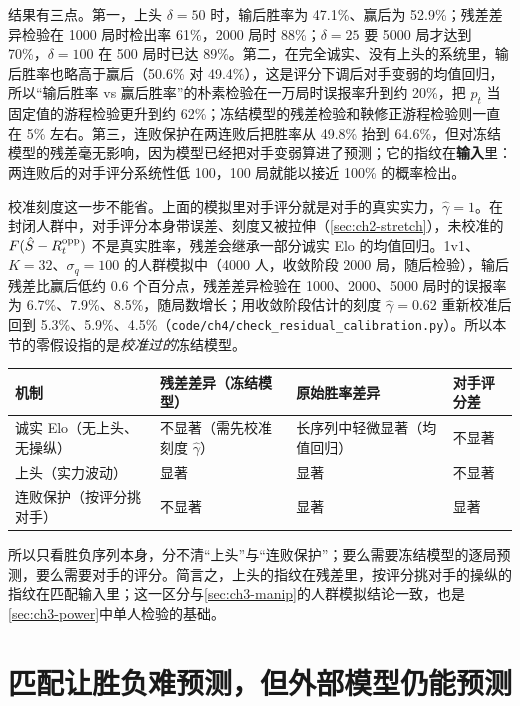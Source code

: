 结果有三点\tagOwn。第一，上头 $\delta=50$ 时，输后胜率为 47.1\%、赢后为 52.9\%；残差差异检验在 1000 局时检出率 61\%，2000 局时 88\%；$\delta=25$ 要 5000 局才达到 70\%，$\delta=100$ 在 500 局时已达 89\%。第二，在完全诚实、没有上头的系统里，输后胜率也略高于赢后（50.6\% 对 49.4\%），这是评分下调后对手变弱的均值回归，所以“输后胜率 vs 赢后胜率”的朴素检验在一万局时误报率升到约 20\%，把 $p_t$ 当固定值的游程检验更升到约 62\%；冻结模型的残差检验和鞅修正游程检验则一直在 5\% 左右。第三，连败保护在两连败后把胜率从 49.8\% 抬到 64.6\%，但对冻结模型的残差毫无影响，因为模型已经把对手变弱算进了预测；它的指纹在\textbf{输入}里：两连败后的对手评分系统性低 100，100 局就能以接近 100\% 的概率检出。

校准刻度这一步不能省。上面的模拟里对手评分就是对手的真实实力，$\hat\gamma=1$。在封闭人群中，对手评分本身带误差、刻度又被拉伸（\cref{sec:ch2-stretch}），未校准的 $F(\hat S-R^{\mathrm{opp}}_t)$ 不是真实胜率，残差会继承一部分诚实 Elo 的均值回归。1v1、$K=32$、$\sigma_q=100$ 的人群模拟中（4000 人，收敛阶段 2000 局，随后检验），输后残差比赢后低约 0.6 个百分点，残差差异检验在 1000、2000、5000 局时的误报率为 6.7\%、7.9\%、8.5\%，随局数增长；用收敛阶段估计的刻度 $\hat\gamma=0.62$ 重新校准后回到 5.3\%、5.9\%、4.5\%（\texttt{code/ch4/check\_residual\_calibration.py}）\tagOwn。所以本节的零假设指的是\emph{校准过的}冻结模型。

\begin{keybox}
\small
\begin{tabularx}{\linewidth}{>{\raggedright\arraybackslash}p{3.2cm}XXX}
\toprule
机制 & 残差差异（冻结模型） & 原始胜率差异 & 对手评分差 \\
\midrule
诚实 Elo（无上头、无操纵） & 不显著（需先校准刻度 $\hat\gamma$） & 长序列中轻微显著（均值回归） & 不显著 \\
上头（实力波动） & 显著 & 显著 & 不显著 \\
连败保护（按评分挑对手） & 不显著 & 显著 & 显著 \\
\bottomrule
\end{tabularx}
\end{keybox}

所以只看胜负序列本身，分不清“上头”与“连败保护”；要么需要冻结模型的逐局预测，要么需要对手的评分。简言之，上头的指纹在残差里，按评分挑对手的操纵的指纹在匹配输入里；这一区分与\cref{sec:ch3-manip}的人群模拟结论一致，也是\cref{sec:ch3-power}中单人检验的基础。

\section{匹配让胜负难预测，但外部模型仍能预测}
\label{sec:ch4-external}

